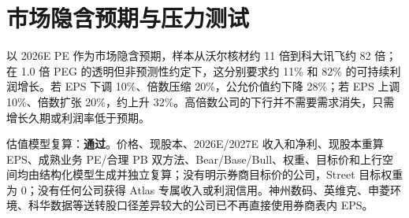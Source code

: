 \section{市场隐含预期与压力测试}

以 2026E PE 作为市场隐含预期，样本从沃尔核材约 11 倍到科大讯飞约 82 倍；在 1.0 倍 PEG 的透明但非预测性约定下，这分别要求约 11\% 和 82\% 的可持续利润增长。若 EPS 下调 10\%、倍数压缩 20\%，公允价值约下降 28\%；若 EPS 上调 10\%、倍数扩张 20\%，约上升 32\%。高倍数公司的下行并不需要需求消失，只需增长久期或利润率低于预期。

\begin{riskbox}[估值审计结论]
估值模型复算：\textbf{通过}。价格、现股本、2026E/2027E 收入和净利、现股本重算 EPS、成熟业务 PE/合理 P\!B 双方法、Bear/Base/Bull、权重、目标价和上行空间均由结构化模型生成并独立复算；没有明示券商目标价的公司，Street 目标权重为 0；没有任何公司获得 Atlas 专属收入或利润信用。神州数码、英维克、申菱环境、科华数据等送转股口径差异较大的公司已不再直接使用券商表内 EPS。
\end{riskbox}
